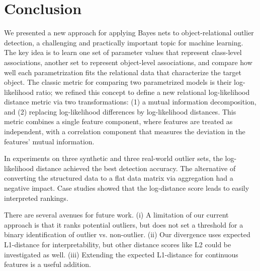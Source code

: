 \documentclass[conference]{IEEEtran}
\begin{document}
								
\section{Conclusion} We presented a new approach for applying Bayes nets to object-relational outlier detection, a challenging and practically important topic for machine learning. The key idea is to learn one set of parameter values that represent class-level associations, another set to represent object-level associations, and compare how well each parametrization fits the relational data that characterize the target object. The classic metric for comparing two parametrized models is their log-likelihood ratio; we refined this concept to define  a new relational log-likelihood distance metric via two transformations:  (1) a mutual information decomposition, and (2) replacing log-likelihood differences by log-likelihood distances. This metric combines a single feature component, where features are treated as independent, with a correlation component that measures the deviation in the features' mutual information.

In experiments on three synthetic and three real-world outlier sets, the log-likelihood distance achieved the best detection accuracy. The alternative of converting the structured data to a flat data matrix via aggregation had a negative impact. %
Case studies showed that the log-distance score leads to easily interpreted rankings.
%

 							
								There are several avenues for future work.  (i) A limitation of our current approach is that it ranks potential outliers, but does not set a threshold for a binary identification of outlier vs. non-outlier. (ii) Our divergence uses expected L1-distance for interpretability, but other distance scores like L2 could be investigated as well. (iii) Extending the expected L1-distance for continuous features is a useful addition. 
								
\end{document}
